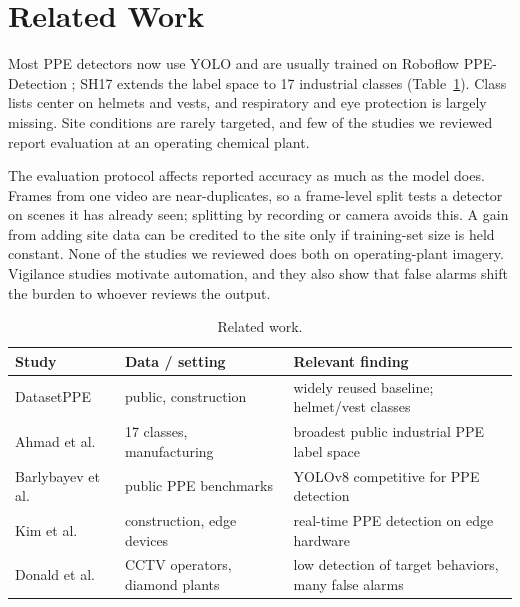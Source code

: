 \section{Related Work}\label{sec:related}

Most PPE detectors now use YOLO \cite{ultralytics2023,ppeyolo2024,edgeyolo2024} and are usually trained on Roboflow PPE-Detection \cite{roboflowppe}; SH17 \cite{ahmad2024sh17} extends the label space to 17 industrial classes (Table~\ref{tab:relwork}). Class lists center on helmets and vests, and respiratory and eye protection is largely missing. Site conditions are rarely targeted, and few of the studies we reviewed report evaluation at an operating chemical plant.

The evaluation protocol affects reported accuracy as much as the model does. Frames from one video are near-duplicates, so a frame-level split tests a detector on scenes it has already seen; splitting by recording or camera avoids this. A gain from adding site data can be credited to the site only if training-set size is held constant. None of the studies we reviewed does both on operating-plant imagery. Vigilance studies \cite{parasuraman1984,donald2015} motivate automation, and they also show that false alarms shift the burden to whoever reviews the output.

\begin{table}[H]
\caption{Related work.}
\label{tab:relwork}
\centering
\scriptsize
\setlength{\tabcolsep}{4pt}
\begin{tabular}{lll}
\toprule
\textbf{Study} & \textbf{Data / setting} & \textbf{Relevant finding} \\
\midrule
DatasetPPE \cite{roboflowppe} & public, construction & widely reused baseline; helmet/vest classes \\
Ahmad et al.\ \cite{ahmad2024sh17} & 17 classes, manufacturing & broadest public industrial PPE label space \\
Barlybayev et al.\ \cite{ppeyolo2024} & public PPE benchmarks & YOLOv8 competitive for PPE detection \\
Kim et al.\ \cite{edgeyolo2024} & construction, edge devices & real-time PPE detection on edge hardware \\
Donald et al.\ \cite{donald2015} & CCTV operators, diamond plants & low detection of target behaviors, many false alarms \\
\bottomrule
\end{tabular}
\end{table}
